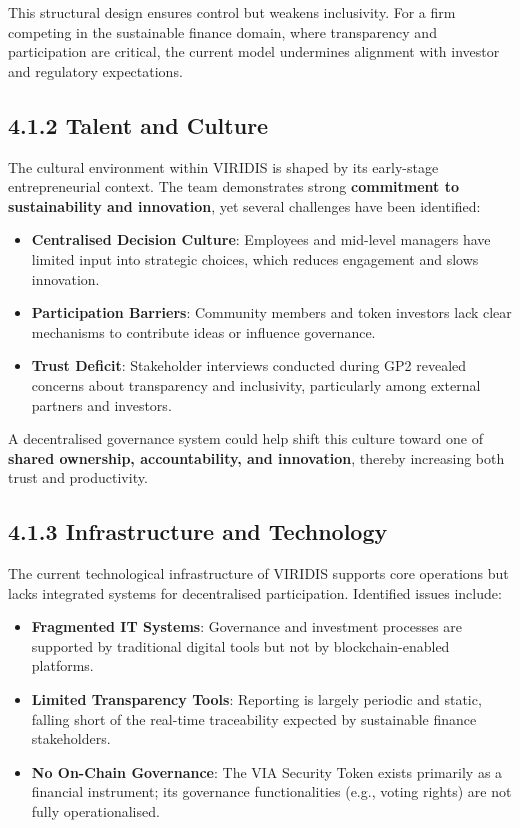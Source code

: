 \documentclass[
  english,
  12pt,
  oneside,
  open=any]{scrbook}
\providecommand{\tightlist}{%
  \setlength{\itemsep}{0pt}\setlength{\parskip}{0pt}}\usepackage{longtable,booktabs,array}
\begin{document}
This structural design ensures control but weakens inclusivity. For a
firm competing in the sustainable finance domain, where transparency and
participation are critical, the current model undermines alignment with
investor and regulatory expectations.

\subsection{4.1.2 Talent and Culture}\label{sec-culture}

The cultural environment within VIRIDIS is shaped by its early-stage
entrepreneurial context. The team demonstrates strong \textbf{commitment
to sustainability and innovation}, yet several challenges have been
identified:

\begin{itemize}
\tightlist
\item
  \textbf{Centralised Decision Culture}: Employees and mid-level
  managers have limited input into strategic choices, which reduces
  engagement and slows innovation.\\
\item
  \textbf{Participation Barriers}: Community members and token investors
  lack clear mechanisms to contribute ideas or influence governance.\\
\item
  \textbf{Trust Deficit}: Stakeholder interviews conducted during GP2
  revealed concerns about transparency and inclusivity, particularly
  among external partners and investors.
\end{itemize}

A decentralised governance system could help shift this culture toward
one of \textbf{shared ownership, accountability, and innovation},
thereby increasing both trust and productivity.

\subsection{4.1.3 Infrastructure and Technology}\label{sec-it}

The current technological infrastructure of VIRIDIS supports core
operations but lacks integrated systems for decentralised participation.
Identified issues include:

\begin{itemize}
\tightlist
\item
  \textbf{Fragmented IT Systems}: Governance and investment processes
  are supported by traditional digital tools but not by
  blockchain-enabled platforms.\\
\item
  \textbf{Limited Transparency Tools}: Reporting is largely periodic and
  static, falling short of the real-time traceability expected by
  sustainable finance stakeholders.\\
\item
  \textbf{No On-Chain Governance}: The VIA Security Token exists
  primarily as a financial instrument; its governance functionalities
  (e.g., voting rights) are not fully operationalised.
\end{itemize}
\end{document}
